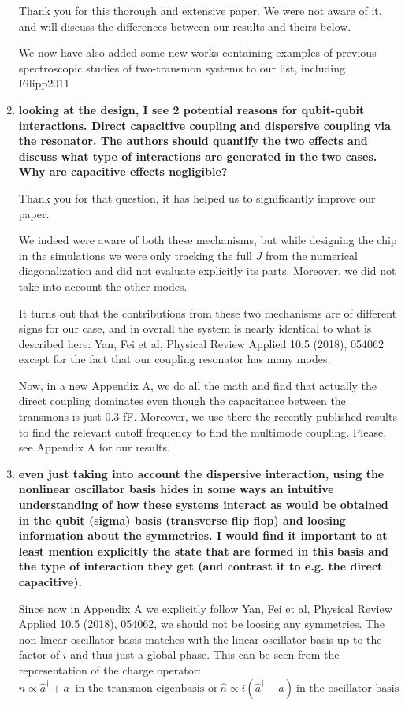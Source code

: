 \documentclass{article}
\begin{document}
\begin{enumerate}
	Thank you for this thorough and extensive paper. We were not aware of it, and will discuss the differences between our results and theirs below.
	
	We now have also added some new works containing examples of previous spectroscopic studies of two-transmon systems to our list, including Filipp2011
	
	\item \textbf{looking at the design, I see 2 potential reasons for qubit-qubit
		interactions. Direct capacitive coupling and dispersive coupling via
		the resonator. The authors should quantify the two effects and discuss
		what type of interactions are generated in the two cases. Why are
		capacitive effects negligible?}
	
	Thank you for that question, it has helped us to significantly improve our paper. 
	
	We indeed were aware of both these mechanisms, but while designing the chip in the simulations we were only tracking the full $J$ from the numerical diagonalization and did not evaluate explicitly its parts. Moreover, we did not take into account the other modes. 
	
	It turns out that the contributions from these two mechanisms are of different signs for our case, and in overall the system is nearly identical to what is described here: Yan, Fei et al, Physical Review Applied 10.5 (2018), 054062 except for the fact that our coupling resonator has many modes.
	
	Now, in a new Appendix A, we do all the math and find that actually the direct coupling dominates even though the capacitance between the transmons is just 0.3 fF. Moreover, we use there the recently published results to find the relevant cutoff frequency to find the multimode coupling. Please, see Appendix A for our results.
	
	
	\item \textbf{even just taking into account the dispersive interaction, using the
	nonlinear oscillator basis hides in some ways an intuitive
	understanding of how these systems interact as would be obtained in
	the qubit (sigma) basis (transverse flip flop) and loosing information
	about the symmetries. I would find it important to at least mention
	explicitly the state that are formed in this basis and the type of
	interaction they get (and contrast it to e.g. the direct capacitive).
	}
	
	Since now in Appendix A we explicitly follow Yan, Fei et al, Physical Review Applied 10.5 (2018), 054062, we should not be loosing any symmetries. The non-linear oscillator basis matches 
	with the linear oscillator basis up to the factor of $i$ and thus just a global phase. This can be seen from the representation of the charge operator:
	\[
	\hat n \propto \hat a^\dag + a\  \text{ in the transmon eigenbasis or}\ \hat n \propto i(\hat a^\dag - a)\ \text{in the oscillator basis}  
	\]
	

\end{enumerate}
\end{document}
